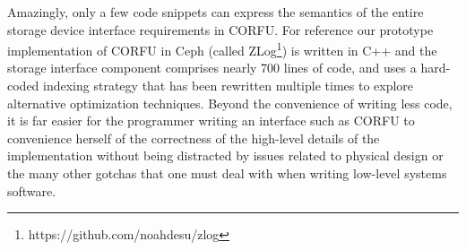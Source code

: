 Amazingly, only a few code snippets can express the semantics of the entire
storage device interface requirements in CORFU. For reference our prototype
implementation of CORFU in Ceph (called
ZLog\footnote{https://github.com/noahdesu/zlog}) is written in C++ and the
storage interface component comprises nearly 700 lines of code, and uses a
hard-coded indexing strategy that has been rewritten multiple times to explore
alternative optimization techniques. Beyond the convenience of writing less
code, it is far easier for the programmer writing an interface such as CORFU
to convenience herself of the correctness of the high-level details of the
implementation without being distracted by issues related to physical design
or the many other gotchas that one must deal with when writing low-level
systems software.
